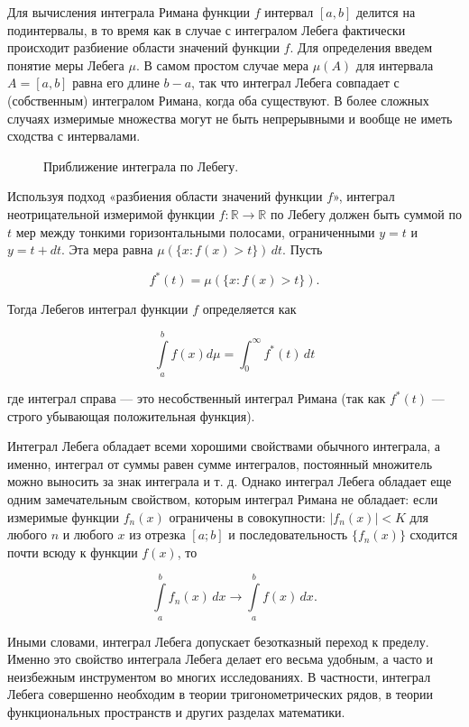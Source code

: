 \documentclass[a4paper,14pt]{extarticle}
\begin{document}
Для вычисления интеграла Римана функции $f$ интервал $[a, b]$ делится на подинтервалы, в то время как в случае с интегралом Лебега фактически происходит разбиение области значений функции $f$. Для определения введем понятие меры Лебега $\mu$. В самом простом случае мера $\mu(A)$ для интервала $A = [a, b]$ равна его длине $b - a$, так что интеграл Лебега совпадает с (собственным) интегралом Римана, когда оба существуют. В более сложных случаях измеримые множества могут не быть непрерывными и вообще не иметь сходства с интервалами.

\begin{figure}[h]
    \centering
    
    \caption{Приближение интеграла по Лебегу.}
\end{figure}

Используя подход «разбиения области значений функции $f$», интеграл неотрицательной измеримой функции $f : \mathbb{R} \to \mathbb{R}$ по Лебегу должен быть суммой по $t$ мер между тонкими горизонтальными полосами, ограниченными $y = t$ и $y = t + dt$. Эта мера равна $\mu (\{x : f(x) > t\}) \, dt$. Пусть

$$
f^*(t) = \mu(\{x : f(x) > t\}).
$$

Тогда Лебегов интеграл функции $f$ определяется как

$$
\int\limits_a^b f(x) d\mu = \int_0^\infty f^*(t)\,dt
$$

\noindent где интеграл справа — это несобственный интеграл Римана (так как $f^*(t)$ — строго убывающая положительная функция). ~\cite{wikipedia_lebesgue_integral}

Интеграл Лебега обладает всеми хорошими свойствами обычного интеграла, а именно, интеграл от суммы равен сумме интегралов, постоянный множитель можно выносить за знак интеграла и т. д. Однако интеграл Лебега обладает еще одним замечательным свойством, которым интеграл Римана не обладает: если измеримые функции $f_n(x)$ ограничены в совокупности: $|f_n(x)| < K$ для любого $n$ и любого $x$ из отрезка $[a; b]$ и последовательность $\{f_n(x)\}$ сходится почти всюду к функции $f(x)$, то

$$
\int\limits_{a}^{b}f_n(x)\,dx\to\int\limits_{a}^{b}f(x)\,dx.
$$

Иными словами, интеграл Лебега допускает безотказный переход к пределу. Именно это свойство интеграла Лебега делает его весьма удобным, а часто и неизбежным инструментом во многих исследованиях. В частности, интеграл Лебега совершенно необходим в теории тригонометрических рядов, в теории функциональных пространств и других разделах математики. ~\cite{mathhelpplanet_lebesgue_integral}
\end{document}
